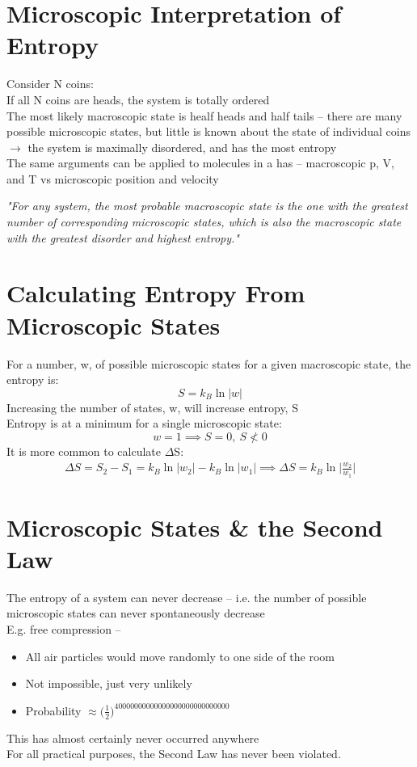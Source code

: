 \documentclass[a4paper, 11pt, fleqn, normalem]{report}
\begin{document}
\section*{Microscopic Interpretation of Entropy}
Consider N coins:\\
If all N coins are heads, the system is totally ordered \\
The most likely macroscopic state is healf heads and half tails -- there are many possible microscopic states, but little is known about the state of individual coins $\rightarrow$ the system is maximally disordered, and has the most entropy \\
The same arguments can be applied to molecules in a has -- macroscopic p, V, and T vs microscopic position and velocity

\emph{"For any system, the most probable macroscopic state is the one with the greatest number of corresponding microscopic states, which is also the macroscopic state with the greatest disorder and highest entropy."}

\section*{Calculating Entropy From Microscopic States}
For a number, w, of possible microscopic states for a given macroscopic state, the entropy is:
\begin{equation*}
	S = k_{B}\ln{|w|}
\end{equation*}
Increasing the number of states, w, will increase entropy, S \\
Entropy is at a minimum for a single microscopic state:
\begin{equation*}
	w = 1 \implies S = 0, ~ S \nless 0
\end{equation*}
It is more common to calculate $\Delta$S:
\begin{gather*}
	{\Delta}S = S_{2} - S_{1} = k_{B}\ln{|w_{2}|} - k_{B}\ln{|w_{1}|}
	\implies {\Delta}S = k_{B}\ln{\bigg|\frac{w_{2}}{w_{1}}\bigg|}
\end{gather*}

\section*{Microscopic States \& the Second Law}
The entropy of a system can never decrease -- i.e. the number of possible microscopic states can never spontaneously decrease \\
E.g. free compression --
\vspace{-8pt}
\begin{itemize}
	\item All air particles would move randomly to one side of the room
	\item Not impossible, just very unlikely
	\item Probability $\approx \big(\frac{1}{2}\big)^{40000000000000000000000000000}$
\end{itemize}
This has almost certainly never occurred anywhere \\
For all practical purposes, the Second Law has never been violated.
\end{document}
